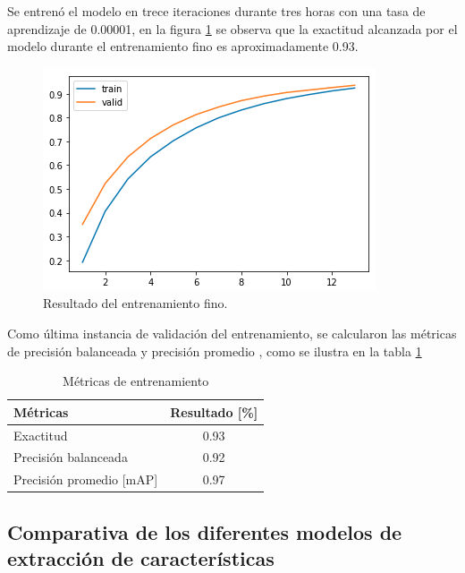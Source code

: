 Se entrenó el modelo en trece iteraciones durante tres horas con una tasa de aprendizaje de 0.00001, en la figura \ref{fig:entrenamientoFinoResultado} se observa que la exactitud alcanzada por el modelo durante el entrenamiento fino es aproximadamente 0.93.

\begin{figure}[ht]
	\centering
	\includegraphics[scale=1.]{./Figures/entrenamientoFinoResultado.png}
	\caption{Resultado del entrenamiento fino.}
	\label{fig:entrenamientoFinoResultado}
\end{figure}

Como última instancia de validación del entrenamiento, se calcularon las métricas de precisión balanceada \citep{BalancedAccuracy} y precisión promedio \citep{mAP}, como se ilustra en la tabla \ref{tab:metricasEntrenamiento}

\begin{table}[h]
	\centering
	\caption[Métrica Entrenamiento]{Métricas de entrenamiento}
	\begin{tabular}{l c}    
		\toprule
		\textbf{Métricas}   & \textbf{Resultado [\%]} \\
		\midrule
		Exactitud & 0.93 \\
		Precisión balanceada & 0.92 \\
		Precisión promedio [mAP] & 0.97 \\
		\bottomrule
		\hline
	\end{tabular}
	\label{tab:metricasEntrenamiento}
\end{table}

\newpage

\subsection{Comparativa de los diferentes modelos de extracción de características}
\label{sec:comparativaExtractores}

